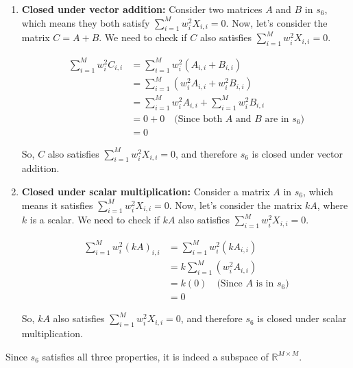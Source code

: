 \begin{enumerate}[label=(\alph*)]
\begin{enumerate}[label=\roman*.]
		      \item \textbf{Closed under vector addition:} Consider two matrices $A$ and $B$ in $s_6$, which means
		            they both satisfy $\sum_{i=1}^{M}w_i^2X_{i,i} = 0$. Now, let's consider the matrix
		            $C = A + B$. We need to check if $C$ also satisfies $\sum_{i=1}^{M}w_i^2X_{i,i} = 0$.

		            $$
			            \begin{aligned}
				            \sum_{i=1}^{M}w_i^2C_{i,i} & = \sum_{i=1}^{M}w_i^2(A_{i,i} + B_{i,i})                   \\
				                                       & = \sum_{i=1}^{M}(w_i^2A_{i,i} + w_i^2B_{i,i})              \\
				                                       & = \sum_{i=1}^{M}w_i^2A_{i,i} + \sum_{i=1}^{M}w_i^2B_{i,i}  \\
				                                       & = 0 + 0 \quad \text{(Since both $A$ and $B$ are in $s_6$)} \\
				                                       & = 0
			            \end{aligned}
		            $$

		            So, $C$ also satisfies $\sum_{i=1}^{M}w_i^2X_{i,i} = 0$, and therefore $s_6$ is
		            closed under vector addition.

		      \item \textbf{Closed under scalar multiplication:} Consider a matrix $A$ in $s_6$, which means it satisfies
		            $\sum_{i=1}^{M}w_i^2X_{i,i} = 0$. Now, let's consider the matrix $kA$, where $k$
		            is a scalar. We need to check if $kA$ also satisfies $\sum_{i=1}^{M}w_i^2X_{i,i} = 0$.

		            $$
			            \begin{aligned}
				            \sum_{i=1}^{M}w_i^2(kA)_{i,i} & = \sum_{i=1}^{M}w_i^2(kA_{i,i})             \\
				                                          & = k\sum_{i=1}^{M}(w_i^2A_{i,i})             \\
				                                          & = k(0) \quad \text{(Since $A$ is in $s_6$)} \\
				                                          & = 0
			            \end{aligned}
		            $$

		            So, $kA$ also satisfies $\sum_{i=1}^{M}w_i^2X_{i,i} = 0$, and therefore $s_6$ is
		            closed under scalar multiplication.

	      \end{enumerate}

	      Since $s_6$ satisfies all three properties, it is indeed a subspace of $\mathbb{R}^{M \times M}$.
\end{enumerate}
